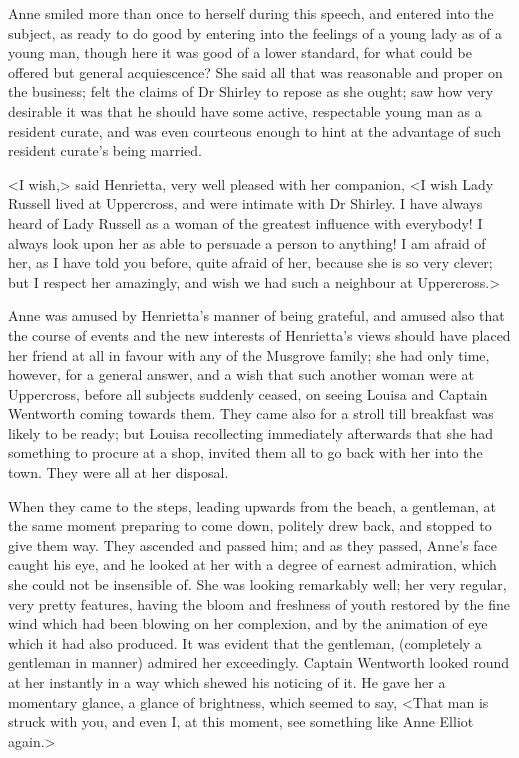 Anne smiled more than once to herself during this speech, and entered into the subject, as ready to do good by entering into the feelings of a young lady as of a young man, though here it was good of a lower standard, for what could be offered but general acquiescence? She said all that was reasonable and proper on the business; felt the claims of Dr Shirley to repose as she ought; saw how very desirable it was that he should have some active, respectable young man as a resident curate, and was even courteous enough to hint at the advantage of such resident curate's being married.

<I wish,> said Henrietta, very well pleased with her companion, <I wish Lady Russell lived at Uppercross, and were intimate with Dr Shirley. I have always heard of Lady Russell as a woman of the greatest influence with everybody! I always look upon her as able to persuade a person to anything! I am afraid of her, as I have told you before, quite afraid of her, because she is so very clever; but I respect her amazingly, and wish we had such a neighbour at Uppercross.>

Anne was amused by Henrietta's manner of being grateful, and amused also that the course of events and the new interests of Henrietta's views should have placed her friend at all in favour with any of the Musgrove family; she had only time, however, for a general answer, and a wish that such another woman were at Uppercross, before all subjects suddenly ceased, on seeing Louisa and Captain Wentworth coming towards them. They came also for a stroll till breakfast was likely to be ready; but Louisa recollecting immediately afterwards that she had something to procure at a shop, invited them all to go back with her into the town. They were all at her disposal.

When they came to the steps, leading upwards from the beach, a gentleman, at the same moment preparing to come down, politely drew back, and stopped to give them way. They ascended and passed him; and as they passed, Anne's face caught his eye, and he looked at her with a degree of earnest admiration, which she could not be insensible of. She was looking remarkably well; her very regular, very pretty features, having the bloom and freshness of youth restored by the fine wind which had been blowing on her complexion, and by the animation of eye which it had also produced. It was evident that the gentleman, (completely a gentleman in manner) admired her exceedingly. Captain Wentworth looked round at her instantly in a way which shewed his noticing of it. He gave her a momentary glance, a glance of brightness, which seemed to say, <That man is struck with you, and even I, at this moment, see something like Anne Elliot again.>

